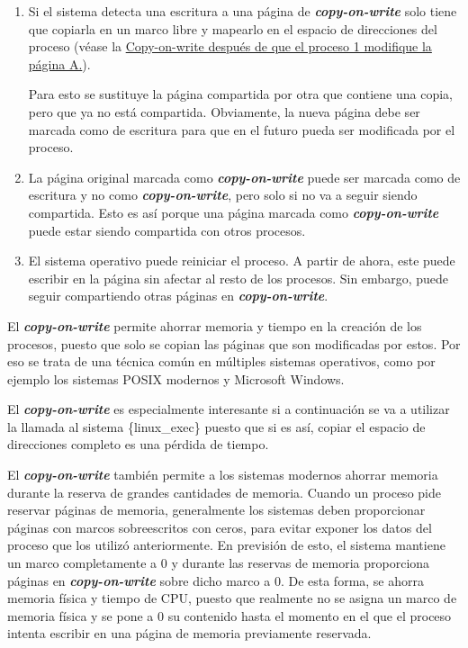 \begin{enumerate}
\def\labelenumi{\arabic{enumi}.}
\item
  Si el sistema detecta una escritura a una página de
  \textbf{\emph{copy-on-write}} solo tiene que copiarla en un marco
  libre y mapearlo en el espacio de direcciones del proceso (véase la
  \hyperref[fig-copy-on-write-2]{Copy-on-write después de que el proceso
  1 modifique la página A.}).

  Para esto se sustituye la página compartida por otra que contiene una
  copia, pero que ya no está compartida. Obviamente, la nueva página
  debe ser marcada como de escritura para que en el futuro pueda ser
  modificada por el proceso.
\item
  La página original marcada como \textbf{\emph{copy-on-write}} puede
  ser marcada como de escritura y no como \textbf{\emph{copy-on-write}},
  pero solo si no va a seguir siendo compartida. Esto es así porque una
  página marcada como \textbf{\emph{copy-on-write}} puede estar siendo
  compartida con otros procesos.
\item
  El sistema operativo puede reiniciar el proceso. A partir de ahora,
  este puede escribir en la página sin afectar al resto de los procesos.
  Sin embargo, puede seguir compartiendo otras páginas en
  \textbf{\emph{copy-on-write}}.
\end{enumerate}

El \textbf{\emph{copy-on-write}} permite ahorrar memoria y tiempo en la
creación de los procesos, puesto que solo se copian las páginas que son
modificadas por estos. Por eso se trata de una técnica común en
múltiples sistemas operativos, como por ejemplo los sistemas POSIX
modernos y Microsoft Windows.

El \textbf{\emph{copy-on-write}} es especialmente interesante si a
continuación se va a utilizar la llamada al sistema \{linux\_exec\}
puesto que si es así, copiar el espacio de direcciones completo es una
pérdida de tiempo.

El \textbf{\emph{copy-on-write}} también permite a los sistemas modernos
ahorrar memoria durante la reserva de grandes cantidades de memoria.
Cuando un proceso pide reservar páginas de memoria, generalmente los
sistemas deben proporcionar páginas con marcos sobreescritos con ceros,
para evitar exponer los datos del proceso que los utilizó anteriormente.
En previsión de esto, el sistema mantiene un marco completamente a 0 y
durante las reservas de memoria proporciona páginas en
\textbf{\emph{copy-on-write}} sobre dicho marco a 0. De esta forma, se
ahorra memoria física y tiempo de CPU, puesto que realmente no se asigna
un marco de memoria física y se pone a 0 su contenido hasta el momento
en el que el proceso intenta escribir en una página de memoria
previamente reservada.

